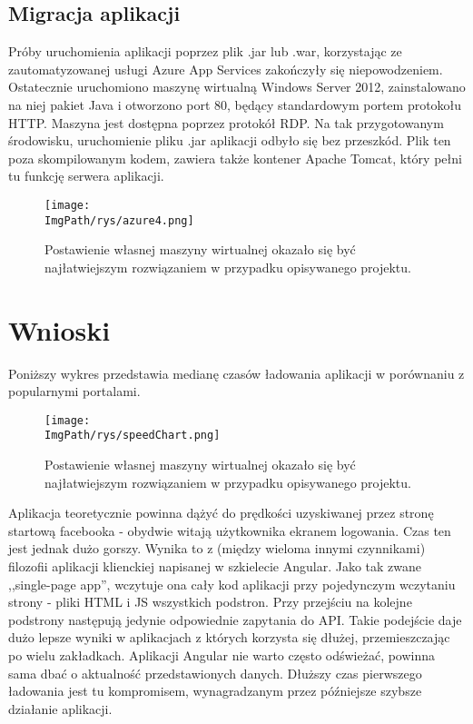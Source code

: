 \documentclass[a4paper,12pt,twoside,openany]{report}
\newcommand{\ImgPath}{.}
\begin{document}
\section{Migracja aplikacji}
Próby uruchomienia aplikacji poprzez plik .jar lub .war, korzystając ze zautomatyzowanej usługi Azure App Services zakończyły się niepowodzeniem. Ostatecznie uruchomiono maszynę wirtualną Windows Server 2012, zainstalowano na niej pakiet Java i otworzono port 80, będący standardowym portem protokołu HTTP. Maszyna jest dostępna poprzez protokół RDP. Na tak przygotowanym środowisku, uruchomienie pliku .jar aplikacji odbyło się bez przeszkód. Plik ten poza skompilowanym kodem, zawiera także kontener Apache Tomcat, który pełni tu funkcję serwera aplikacji.
				\begin{figure}[!htbp]
					\begin{center}
						\centering
						\texttt{[image: \\ImgPath/rys/azure4.png]}
					\end{center}
					\caption{Postawienie własnej maszyny wirtualnej okazało się być najłatwiejszym rozwiązaniem w przypadku opisywanego projektu.}
					\label{UMLTS}
				\end{figure}
\chapter{Wnioski}
Poniższy wykres przedstawia medianę czasów ładowania aplikacji w porównaniu z popularnymi portalami. 
				\begin{figure}[!htbp]
					\begin{center}
						\centering
						\texttt{[image: \\ImgPath/rys/speedChart.png]}
					\end{center}
					\caption{Postawienie własnej maszyny wirtualnej okazało się być najłatwiejszym rozwiązaniem w przypadku opisywanego projektu.}
					\label{UMLTS}
				\end{figure}
Aplikacja teoretycznie powinna dążyć do prędkości uzyskiwanej przez stronę startową facebooka - obydwie witają użytkownika ekranem logowania. Czas ten jest jednak dużo gorszy. Wynika to z (między wieloma innymi czynnikami) filozofii aplikacji klienckiej napisanej w szkielecie Angular. Jako tak zwane ,,single-page app'', wczytuje ona cały kod aplikacji przy pojedynczym wczytaniu strony  - pliki HTML i JS wszystkich podstron. Przy przejściu na kolejne podstrony następują jedynie odpowiednie zapytania do API. Takie podejście daje dużo lepsze wyniki w aplikacjach z których korzysta się dłużej, przemieszczając po wielu zakładkach. Aplikacji Angular nie warto często odświeżać, powinna sama dbać o aktualność przedstawionych danych. Dłuższy czas pierwszego ładowania jest tu kompromisem, wynagradzanym przez późniejsze szybsze działanie aplikacji.\\
\end{document}
